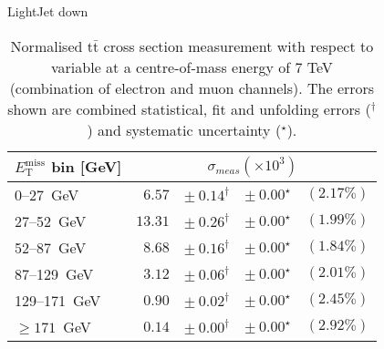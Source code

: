 \documentclass{article}
\newcommand{\ttbar}{\ensuremath{\text{t}\bar{\text{t}}}\xspace}
\newcommand{\GeV}{GeV}
\begin{document}
LightJet down
\begin{table}[htbp]
\setlength{\tabcolsep}{2pt}
\centering
\caption{Normalised \ttbar cross section measurement with respect to \MET variable
at a centre-of-mass energy of 7 TeV (combination of electron and muon channels). The errors shown are combined statistical, fit and unfolding errors ($^\dagger$) and systematic uncertainty ($^\star$).}
\label{tab:MET_xsections_7TeV_LightJet_down_combined}
\begin{tabular}{lrrrr}
\hline
$E_{\mathrm{T}}^{\mathrm{miss}}$ bin [\GeV] & \multicolumn{4}{c}{$\sigma_{meas} \left(\times 10^{3}\right)$}\\ 
\hline
0--27~\GeV &  $6.57$ & $ \pm~ 0.14^\dagger$ & $ \pm~ 0.00^\star$ & $(2.17\%)$\\ 
27--52~\GeV &  $13.31$ & $ \pm~ 0.26^\dagger$ & $ \pm~ 0.00^\star$ & $(1.99\%)$\\ 
52--87~\GeV &  $8.68$ & $ \pm~ 0.16^\dagger$ & $ \pm~ 0.00^\star$ & $(1.84\%)$\\ 
87--129~\GeV &  $3.12$ & $ \pm~ 0.06^\dagger$ & $ \pm~ 0.00^\star$ & $(2.01\%)$\\ 
129--171~\GeV &  $0.90$ & $ \pm~ 0.02^\dagger$ & $ \pm~ 0.00^\star$ & $(2.45\%)$\\ 
$\geq 171$~\GeV &  $0.14$ & $ \pm~ 0.00^\dagger$ & $ \pm~ 0.00^\star$ & $(2.92\%)$\\ 
\hline 
\end{tabular}
\end{table}
\end{document}
